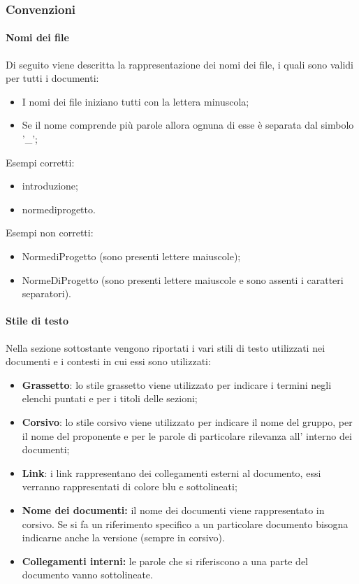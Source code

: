 \subsubsection{Convenzioni}
\paragraph{Nomi dei file}
Di seguito viene descritta la rappresentazione dei nomi dei file, i quali sono validi per tutti i documenti:
\begin{itemize}
    \item I nomi dei file iniziano tutti con la lettera minuscola;
    \item Se il nome comprende più parole allora ognuna di esse è separata dal simbolo '\_';
\end {itemize}
Esempi corretti:
\begin{itemize}
    \item introduzione;
    \item norme\textunderscore di\textunderscore progetto.
\end {itemize}
Esempi non corretti:
\begin{itemize}
    \item Norme\textunderscore di\textunderscore Progetto (sono presenti lettere maiuscole);
    \item NormeDiProgetto (sono presenti lettere maiuscole e sono assenti i caratteri separatori).
\end {itemize}

\paragraph{Stile di testo}
Nella sezione sottostante vengono riportati i vari stili di testo utilizzati nei documenti e i contesti in cui essi sono utilizzati:
\begin {itemize}
    \item \textbf{Grassetto}: lo stile grassetto viene utilizzato per indicare i termini negli elenchi puntati e per i titoli delle sezioni;
    \item \textbf{Corsivo}: lo stile corsivo viene utilizzato per indicare il nome del gruppo, per il nome del proponente e per le parole di particolare rilevanza all' interno dei documenti;
    \item \textbf{Link}: i link rappresentano dei collegamenti esterni al documento, essi verranno rappresentati di colore blu e sottolineati;
    \item \textbf{Nome dei documenti:} il nome dei documenti viene rappresentato in corsivo. Se si fa un riferimento specifico a un particolare documento bisogna indicarne anche la versione (sempre in corsivo).
    \item \textbf{Collegamenti interni:} le parole che si riferiscono a una parte del documento vanno sottolineate.
\end {itemize}

